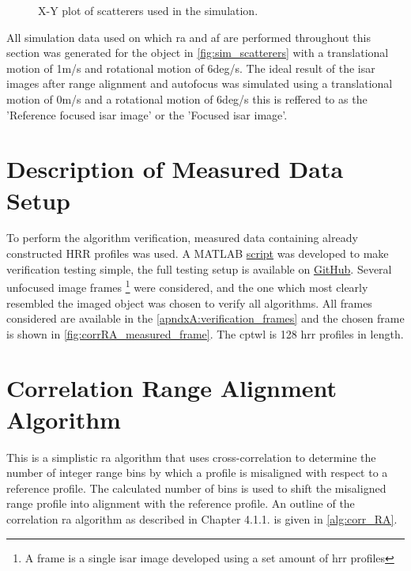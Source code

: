 \documentclass[class=report,11pt,crop=false]{standalone}
\begin{document}
    \begin{figure}[ht]
        \centering
        \captionsetup{type=figure}
        \begin{minipage}{0.5\linewidth} %
            \centering
            \resizebox{\linewidth}{!}{}
            \caption{X-Y plot of scatterers used in the simulation.\label{fig:sim_scatterers}}
        \end{minipage}
    \end{figure}

    All simulation data used on which \gls{ra} and \gls{af} are performed throughout this section was generated for the object in \autoref{fig:sim_scatterers} with a translational motion of 1m/s and rotational motion of 6deg/s. The ideal result of the \gls{isar} images after range alignment and autofocus was simulated using a translational motion of 0m/s and a rotational motion of 6deg/s this is reffered to as the 'Reference focused \gls{isar} image'  or the 'Focused \gls{isar} image'.
\section{Description of Measured Data Setup} \label{subsec:measuredData_setup}
To perform the algorithm verification, measured data containing already constructed \gls{HRR} profiles was used. A \textsc{MATLAB} \href{}{script} was developed to make verification testing simple, the full testing setup is available on \href{}{GitHub}. Several unfocused image frames \footnote{A frame is a single \gls{isar} image developed using a set amount of \gls{hrr} profiles} were considered, and the one which most clearly resembled the imaged object was chosen to verify all algorithms. All frames considered are available in the \autoref{apndxA:verification_frames} and the chosen frame is shown in \autoref{fig:corrRA_measured_frame}. The \gls{cptwl} is 128 \gls{hrr} profiles in length.
\section{Correlation Range Alignment Algorithm}\label{subsec:corrRA}
This is a simplistic \gls{ra} algorithm that uses cross-correlation to determine the number of integer range bins by which a profile is misaligned with respect to a reference profile.
The calculated number of bins is used to shift the misaligned range profile into alignment with the reference profile. An outline of the correlation \gls{ra} algorithm as described in Chapter 4.1.1. \cite{ISARtextbook_Martorella} is given in \autoref{alg:corr_RA}.
\end{document}
